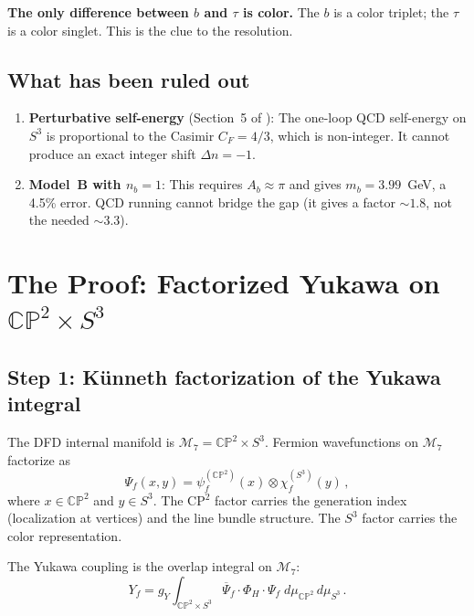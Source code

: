 \documentclass[11pt,a4paper]{article}
\newcommand{\CP}{\mathbb{CP}}
\theoremstyle{definition}
\theoremstyle{remark}
\begin{document}
\textbf{The only difference between $b$ and $\tau$ is color.}  The
$b$ is a color triplet; the $\tau$ is a color singlet.  This is the
clue to the resolution.

\subsection{What has been ruled out}

\begin{enumerate}
\item \textbf{Perturbative self-energy} (Section~5 of
\cite{B_Quark_S3_SelfEnergy}): The one-loop QCD self-energy on $S^3$
is proportional to the Casimir $C_F = 4/3$, which is non-integer.
It cannot produce an exact integer shift $\Delta n = -1$.

\item \textbf{Model~B with $n_b = 1$}: This requires $A_b \approx \pi$
and gives $m_b = 3.99$~GeV, a 4.5\% error.  QCD running cannot bridge
the gap (it gives a factor $\sim 1.8$, not the needed $\sim 3.3$).
\end{enumerate}

\section{The Proof: Factorized Yukawa on $\CP^2 \times S^3$}
\label{sec:proof}

\subsection{Step 1: K\"unneth factorization of the Yukawa integral}

The DFD internal manifold is $\mathcal{M}_7 = \CP^2 \times S^3$.
Fermion wavefunctions on $\mathcal{M}_7$ factorize as
\begin{equation}\label{eq:factorize}
\Psi_f(x, y) = \psi_f^{(\CP^2)}(x) \otimes \chi_f^{(S^3)}(y)\,,
\end{equation}
where $x \in \CP^2$ and $y \in S^3$.  The CP$^2$ factor carries the
generation index (localization at vertices) and the line bundle
structure.  The $S^3$ factor carries the color representation.

The Yukawa coupling is the overlap integral on $\mathcal{M}_7$:
\begin{equation}\label{eq:yukawa-full}
Y_f = g_Y \int_{\CP^2 \times S^3}
\overline{\Psi}_f \cdot \Phi_H \cdot \Psi_f\;
d\mu_{\CP^2}\,d\mu_{S^3}\,.
\end{equation}
\end{document}
